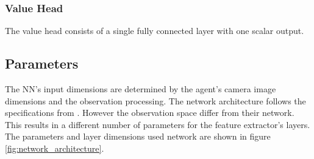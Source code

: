 \subsubsection{Value Head}

The value head consists of a single fully connected layer with one scalar output.


\subsection{Parameters}
The \ac{NN}'s input dimensions are determined by the agent's camera image dimensions and the observation processing. The network architecture follows the specifications from \textcite{human_level_control}. However the observation space differ from their network. This results in a different number of parameters for the feature extractor's layers.
The parameters and layer dimensions used network are shown in figure \ref{fig:network_architecture}.





